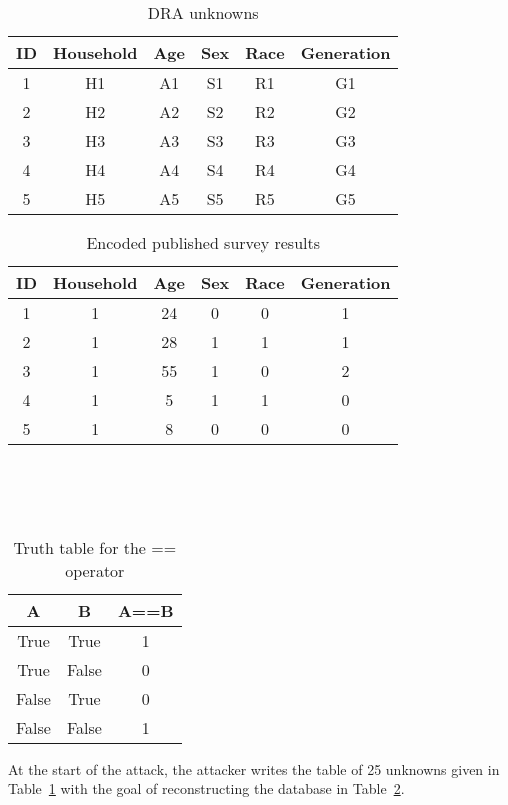 \documentclass[5p,times,11pt]{elsarticle}
\begin{document}
\begin{table}[h]
\begin{tabular}{c|c|c|c|c|c}
ID & Household & Age & Sex & Race & Generation \\
\hline
1 & H1 & A1 & S1 & R1 & G1  \\
2 & H2 & A2 & S2 & R2 & G2  \\
3 & H3 & A3 & S3 & R3 & G3  \\
4 & H4 & A4 & S4 & R4 & G4  \\
5 & H5 & A5 & S5 & R5 & G5  \\
\hline
\end{tabular}
\caption{DRA unknowns}\label{unknownssmall}
\end{table}

\begin{table}[h]
\begin{tabular}{c|c|c|c|c|c}
ID & Household & Age & Sex & Race & Generation \\
\hline
1 & 1 & 24 & 0 & 0 & 1  \\
2 & 1 & 28 & 1 & 1 & 1  \\
3 & 1 & 55 & 1 & 0 & 2  \\
4 & 1 & 5 & 1 & 1 & 0  \\
5 & 1 & 8 & 0 & 0 & 0  \\
\hline
\end{tabular}
\\
\\
\\

\caption{Encoded published survey results}\label{resultsencodedsmall}
\end{table}

\begin{table}[t]
\begin{tabular}{cc|c}
A & B & A==B  \\
\hline
True & True & 1   \\
True & False & 0  \\
False & True & 0  \\
False & False & 1  \\
\hline
\end{tabular}
\caption{Truth table for the == operator}\label{truthtable}
\end{table}

 At the start of the attack, the attacker writes the table of 25 unknowns given in Table~\ref{unknownssmall} with the goal of reconstructing the database in Table~\ref{resultsencodedsmall}.
\end{document}
